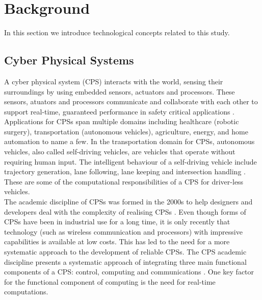 \chapter{Background} \label{sect:background} 
In this section we introduce technological concepts related to this study.
\section{Cyber Physical Systems}

A cyber physical system (CPS) interacts with the world, sensing their surroundings by using embedded sensors, actuators and processors. These sensors, atuators and processors communicate and collaborate with each other to support real-time, guaranteed performance in safety critical applications \cite{sidcyber}. Applications for CPSs span multiple domains including healthcare (robotic surgery), transportation (autonomous vehicles), agriculture, energy, and home automation to name a few. In the transportation domain for CPSs, autonomous vehicles, also called self-driving vehicles, are vehicles that operate without requiring human input. The intelligent behaviour of a self-driving vehicle include trajectory generation, lane following, lane keeping and intersection handling \cite{sidcyber}. These are some of the computational responsibilities of a CPS for driver-less vehicles.\\ 

The academic discipline of CPSs was formed in the 2000s \cite{alur} to help designers and developers deal with the complexity of realising CPSs \cite{gonz}. Even though forms of CPSs have been in industrial use for a long time, it is only recently that technology (such as wireless communication and processors) with impressive capabilities is available at low costs. This has led to the need for a more systematic approach to the development of reliable CPSs. The CPS academic discipline presents a systematic approach of integrating three main functional components of a CPS: control, computing and communications \cite{alur}. One key factor for the functional component of computing is the need for real-time computations.\\

